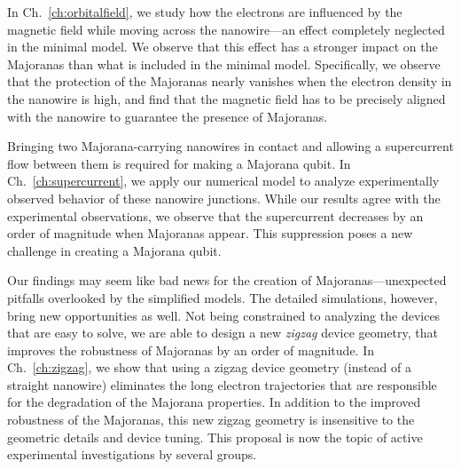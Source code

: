 In Ch.~\ref{ch:orbitalfield}, we study how the electrons are influenced by the magnetic field while moving across the nanowire---an effect completely neglected in the minimal model.
We observe that this effect has a stronger impact on the Majoranas than what is included in the minimal model.
Specifically, we observe that the protection of the Majoranas nearly vanishes when the electron density in the nanowire is high, and find that the magnetic field has to be precisely aligned with the nanowire to guarantee the presence of Majoranas.

Bringing two Majorana-carrying nanowires in contact and allowing a supercurrent flow between them is required for making a Majorana qubit.
In Ch.~\ref{ch:supercurrent}, we apply our numerical model to analyze experimentally observed behavior of these nanowire junctions.
While our results agree with the experimental observations, we observe that the supercurrent decreases by an order of magnitude when Majoranas appear.
This suppression poses a new challenge in creating a Majorana qubit.

Our findings may seem like bad news for the creation of Majoranas---unexpected pitfalls overlooked by the simplified models.
The detailed simulations, however, bring new opportunities as well.
Not being constrained to analyzing the devices that are easy to solve, we are able to design a new \emph{zigzag} device geometry, that improves the robustness of Majoranas by an order of magnitude.
In Ch.~\ref{ch:zigzag}, we show that using a zigzag device geometry (instead of a straight nanowire) eliminates the long electron trajectories that are responsible for the degradation of the Majorana properties.
In addition to the improved robustness of the Majoranas, this new zigzag geometry is insensitive to the geometric details and device tuning.
This proposal is now the topic of active experimental investigations by several groups.

